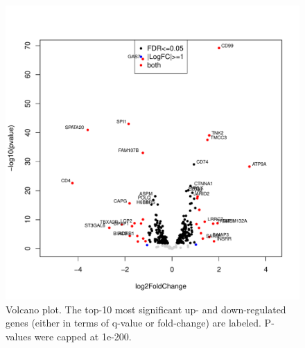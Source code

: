 \clearpage
\begin{figure}[!ht]
\begin{center}
\includegraphics{volcanoplot-component.pdf}
\end{center}
\caption{Volcano plot. The top-10 most significant up- and down-regulated genes (either in terms of q-value or fold-change) are labeled. P-values were capped at 1e-200.}
\end{figure}
